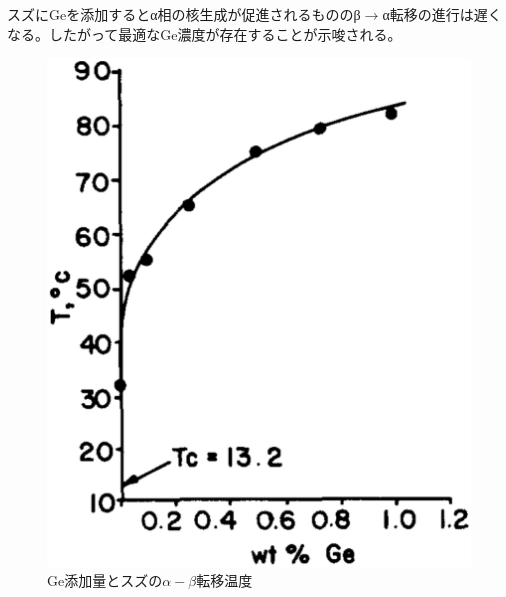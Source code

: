スズにGeを添加するとα相の核生成が促進されるもののβ$\to$α転移の進行は遅くなる。したがって最適なGe濃度が存在することが示唆される。
\begin{figure}[!h]
 \begin{minipage}{0.4\hsize}
    \begin{center}
   \includegraphics[width=\hsize]{Introduction/Ge_Stabilized_Sn.eps}
  \end{center}
  \caption{Ge添加量とスズの$\alpha-\beta$転移温度\cite{Vnuk1984}}
  \label{fig:Ge_Stabilized_Sn}
 \end{minipage}
 \begin{minipage}{0.6\hsize}
    \begin{center}

\end{center}
\end{minipage}
\end{figure}
